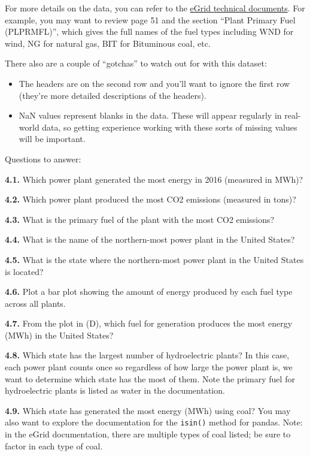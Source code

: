 \documentclass[
  letterpaper,
  DIV=11,
  numbers=noendperiod]{scrartcl}
\providecommand{\tightlist}{%
  \setlength{\itemsep}{0pt}\setlength{\parskip}{0pt}}\usepackage{longtable,booktabs,array}
\begin{document}
For more details on the data, you can refer to the
\href{https://www.epa.gov/sites/default/files/2020-01/documents/egrid2018_technical_support_document.pdf}{eGrid
technical documents}. For example, you may want to review page 51 and
the section ``Plant Primary Fuel (PLPRMFL)'', which gives the full names
of the fuel types including WND for wind, NG for natural gas, BIT for
Bituminous coal, etc.

There also are a couple of ``gotchas'' to watch out for with this
dataset:

\begin{itemize}
\tightlist
\item
  The headers are on the second row and you'll want to ignore the first
  row (they're more detailed descriptions of the headers).
\item
  NaN values represent blanks in the data. These will appear regularly
  in real-world data, so getting experience working with these sorts of
  missing values will be important.
\end{itemize}

Questions to answer:

\textbf{4.1.} Which power plant generated the most energy in 2016
(measured in MWh)?

\textbf{4.2.} Which power plant produced the most CO2 emissions
(measured in tons)?

\textbf{4.3.} What is the primary fuel of the plant with the most CO2
emissions?

\textbf{4.4.} What is the name of the northern-most power plant in the
United States?

\textbf{4.5.} What is the state where the northern-most power plant in
the United States is located?

\textbf{4.6.} Plot a bar plot showing the amount of energy produced by
each fuel type across all plants.

\textbf{4.7.} From the plot in (D), which fuel for generation produces
the most energy (MWh) in the United States?

\textbf{4.8.} Which state has the largest number of hydroelectric
plants? In this case, each power plant counts once so regardless of how
large the power plant is, we want to determine which state has the most
of them. Note the primary fuel for hydroelectric plants is listed as
water in the documentation.

\textbf{4.9.} Which state has generated the most energy (MWh) using
coal? You may also want to explore the documentation for the
\texttt{isin()} method for pandas. Note: in the eGrid documentation,
there are multiple types of coal listed; be sure to factor in each type
of coal.
\end{document}
